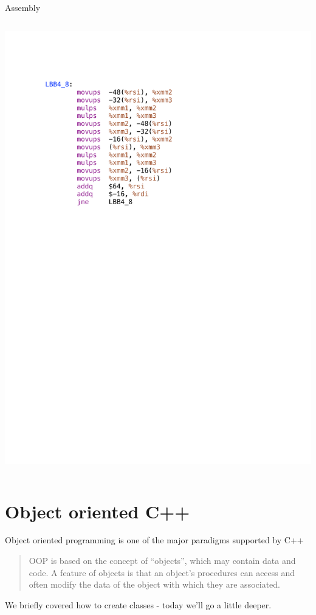 \documentclass[presentation,t]{beamer}
\begin{document}
\begin{frame}{Assembly}
\begin{columns}
\begin{column}{0.5\textwidth}
      \includegraphics[width=\textwidth]{looptests/rangestyleO2.pdf}
    \end{column}   
  \end{columns}
\end{frame}

\section{Object oriented C++}
\begin{frame}
  Object oriented programming is one of the major paradigms supported
  by C++
  \begin{quote}OOP is based on the concept of ``objects'', which may
    contain data and code. A feature of objects is that an object's
    procedures can access and often modify the data of the object with
    which they are associated.
  \end{quote}
  
  We briefly covered how to create classes - today we'll go a little
  deeper.
\end{frame}
\end{document}
